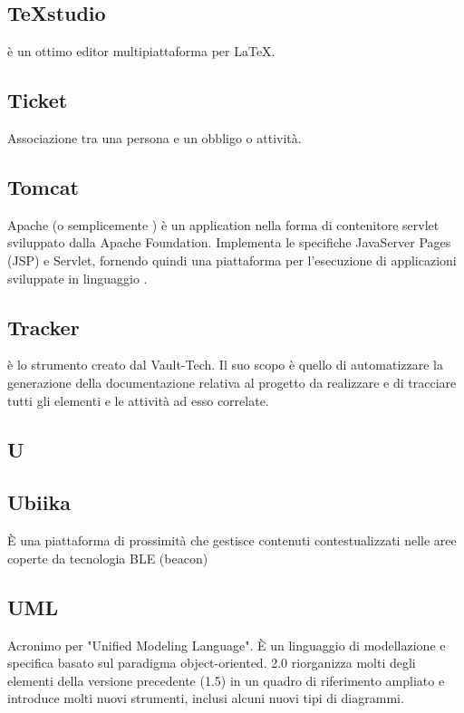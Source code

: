 \subsection{TeXstudio}
 è un ottimo editor multipiattaforma per LaTeX.

\subsection{Ticket}
Associazione tra una persona e un obbligo o attività.

\subsection{Tomcat}
Apache  (o semplicemente ) è un application  nella forma di contenitore servlet  sviluppato dalla Apache  Foundation. Implementa le specifiche JavaServer Pages (JSP) e Servlet, fornendo quindi una piattaforma  per l'esecuzione di applicazioni  sviluppate in linguaggio . 

\subsection{Tracker}
 è lo strumento  creato dal  Vault-Tech. Il suo scopo è quello di automatizzare la generazione della documentazione relativa al progetto da realizzare e di tracciare tutti gli elementi e le attività ad esso correlate.

\newpage

\begin{center}
\Huge\section{\uppercase{U}}
\end{center}

\subsection{Ubiika}
È una piattaforma di prossimità che gestisce contenuti contestualizzati nelle
aree coperte da tecnologia BLE (beacon)​

\subsection{UML}
Acronimo per "Unified Modeling Language". È un linguaggio di modellazione e
specifica basato sul paradigma object-oriented.  2.0 riorganizza molti degli
elementi della versione precedente (1.5) in un quadro di riferimento ampliato e
introduce molti nuovi strumenti, inclusi alcuni nuovi tipi di diagrammi.

